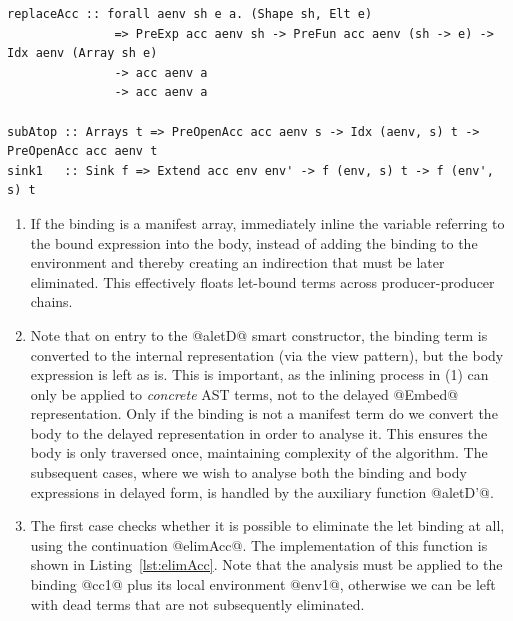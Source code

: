 \begin{lstlisting}[style=haskell_float
    ,label=lst:aletD
    ,caption={Smart constructor for let bindings}]
    replaceAcc :: forall aenv sh e a. (Shape sh, Elt e)
               => PreExp acc aenv sh -> PreFun acc aenv (sh -> e) -> Idx aenv (Array sh e)
               -> acc aenv a
               -> acc aenv a

subAtop :: Arrays t => PreOpenAcc acc aenv s -> Idx (aenv, s) t -> PreOpenAcc acc aenv t
sink1   :: Sink f => Extend acc env env' -> f (env, s) t -> f (env', s) t
\end{lstlisting}

\begin{enumerate}
\item If the binding is a manifest array, immediately inline the variable
    referring to the bound expression into the body, instead of adding the
    binding to the environment and thereby creating an indirection that must be
    later eliminated. This effectively floats let-bound terms across
    producer-producer chains.

\item Note that on entry to the @aletD@ smart constructor, the binding term is
    converted to the internal representation (via the view pattern), but the
    body expression is left as is. This is important, as the inlining process in
    (1) can only be applied to \emph{concrete} AST terms, not to the delayed
    @Embed@ representation. Only if the binding is not a manifest term do we
    convert the body to the delayed representation in order to analyse it. This
    ensures the body is only traversed once, maintaining complexity of the
    algorithm. The subsequent cases, where we wish to analyse both the binding
    and body expressions in delayed form, is handled by the auxiliary function
    @aletD'@.

\item The first case checks whether it is possible to eliminate the let binding
    at all, using the continuation @elimAcc@. The implementation of this
    function is shown in Listing~\ref{lst:elimAcc}. Note that the analysis must
    be applied to the binding @cc1@ plus its local environment @env1@, otherwise
    we can be left with dead terms that are not subsequently eliminated.


\end{enumerate}
